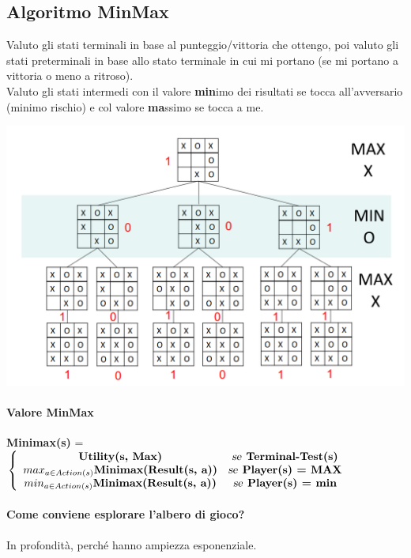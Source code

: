 \documentclass[10pt]{book}
\begin{document}
\subsection{Algoritmo MinMax}
Valuto gli stati terminali in base al punteggio/vittoria che ottengo, poi valuto gli stati preterminali in base allo stato terminale in cui mi portano (se mi portano a vittoria o meno a ritroso).\\
Valuto gli stati intermedi con il valore \textbf{min}imo dei risultati se tocca all'avversario (minimo rischio) e col valore \textbf{ma}ssimo se tocca a me.
\begin{center}
	\includegraphics[scale=0.45]{minmax_tictactoe.png}
\end{center}
\paragraph{Valore MinMax} \textbf{Minimax(s)} = 
\begin{math}
\left\{
\begin{array}{c c}
	\textbf{Utility(s, Max)} & \textsl{se}\:\:\textbf{Terminal-Test(s)}\\
	max_{a \in Action(s)} \textbf{Minimax(Result(s, a))} & \textsl{se}\:\: \textbf{Player(s) = MAX}\\
	min_{a \in Action(s)} \textbf{Minimax(Result(s, a))} & \textsl{se}\:\: \textbf{Player(s) = min}
\end{array}
\right.
\end{math}
\paragraph{Come conviene esplorare l'albero di gioco?} In profondità, perché hanno ampiezza esponenziale.
\pagebreak
\end{document}
